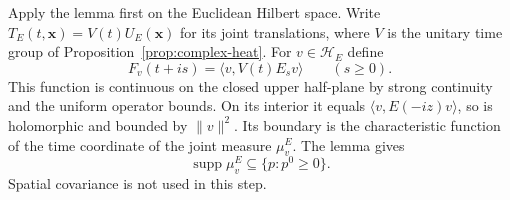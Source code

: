 Apply the lemma first on the Euclidean Hilbert space. Write
$T_E(t,\mathbf x)=V(t)U_E(\mathbf x)$ for its joint translations,
where $V$ is the unitary time group of Proposition~\ref{prop:complex-heat}.
For $v\in\mathcal H_E$ define
\[
 F_v(t+is)=\langle v,V(t)E_s v\rangle\qquad(s\geq0).
\]
This function is continuous on the closed upper half-plane by strong
continuity and the uniform operator bounds. On its interior it equals
$\langle v,E(-iz)v\rangle$, so is holomorphic and bounded by $\|v\|^2$.
Its boundary is the characteristic function of the time coordinate of
the joint measure $\mu^E_v$. The lemma gives
\begin{equation}\label{eq:euclidean-positive-energy}
 \operatorname{supp}\mu^E_v\subseteq\{p:p^0\geq0\}.
\end{equation}
Spatial covariance is not used in this step.

